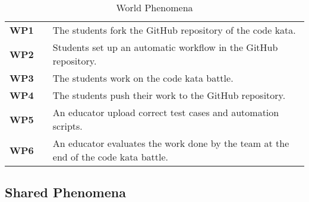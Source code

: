 \begin{table}[H]
    \centering
    \renewcommand{\arraystretch}{1.5} 
    \begin{tabular}{l l p{12cm}}
    \hline
        \textbf{WP1} & & The students fork the GitHub repository of the code kata. \\                                                                                                
        \textbf{WP2} & & Students set up an automatic workflow in the GitHub repository. \\ 
        \textbf{WP3} & & The students work on the code kata battle. \\
        \textbf{WP4} & & The students push their work to the GitHub repository. \\
        \textbf{WP5} & & An educator upload correct test cases and automation scripts. \\
        \textbf{WP6} & & An educator evaluates the work done by the team at the end of the code kata battle. \\
    \hline
    \end{tabular}
    \caption{World Phenomena}
\end{table}

\subsection{Shared Phenomena}

